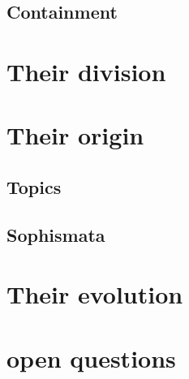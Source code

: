\documentclass[]{article}
\begin{document}
\subsection{Containment}

\section{Their division}

\section{Their origin}

\subsection{Topics}

\subsection{Sophismata}

\section{Their evolution}

\section{open questions}

\printbibliography
\end{document}
